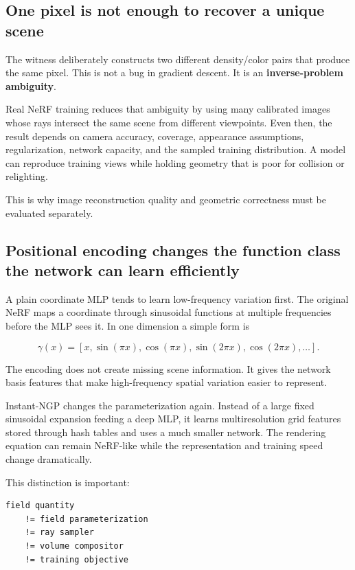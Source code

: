 \subsection{One pixel is not enough to recover a unique scene}\label{04-visual-computing-ii-ch035-one-pixel-is-not-enough-to-recover-a-unique-scene}

The witness deliberately constructs two different density/color pairs that produce the same pixel. This is not a bug in gradient descent. It is an \textbf{inverse-problem ambiguity}.

Real NeRF training reduces that ambiguity by using many calibrated images whose rays intersect the same scene from different viewpoints. Even then, the result depends on camera accuracy, coverage, appearance assumptions, regularization, network capacity, and the sampled training distribution. A model can reproduce training views while holding geometry that is poor for collision or relighting.

This is why image reconstruction quality and geometric correctness must be evaluated separately.

\subsection{Positional encoding changes the function class the network can learn efficiently}\label{04-visual-computing-ii-ch035-positional-encoding-changes-the-function-class-the-network-can-learn-efficiently}

A plain coordinate MLP tends to learn low-frequency variation first. The original NeRF maps a coordinate through sinusoidal functions at multiple frequencies before the MLP sees it. In one dimension a simple form is

\[\gamma(x)=\left[x,\sin(\pi x),\cos(\pi x),\sin(2\pi x),\cos(2\pi x),\ldots\right].\]

The encoding does not create missing scene information. It gives the network basis features that make high-frequency spatial variation easier to represent.

Instant-NGP changes the parameterization again. Instead of a large fixed sinusoidal expansion feeding a deep MLP, it learns multiresolution grid features stored through hash tables and uses a much smaller network. The rendering equation can remain NeRF-like while the representation and training speed change dramatically.

This distinction is important:

\begin{verbatim}
field quantity
    != field parameterization
    != ray sampler
    != volume compositor
    != training objective
\end{verbatim}

